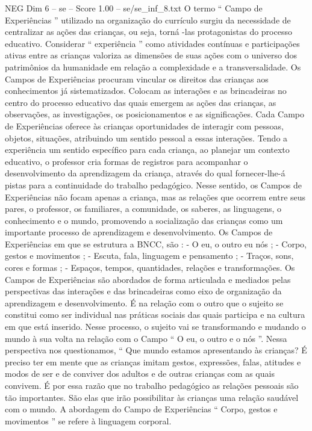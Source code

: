 \begin{textsample}{NEG Dim 6 – se – Score 1.00 – se/se\_inf\_8.txt}
O termo “ Campo de Experiências ” utilizado na organização do currículo surgiu da necessidade de centralizar as ações das crianças, ou seja, torná -las protagonistas do processo educativo.
Considerar “ experiência ” como atividades contínuas e participações ativas entre as crianças valoriza as dimensões de suas ações com o universo dos patrimônios da humanidade em relação a complexidade e a transversalidade.
Os Campos de Experiências procuram vincular os direitos das crianças aos conhecimentos já sistematizados.
Colocam as interações e as brincadeiras no centro do processo educativo das quais emergem as ações das crianças, as observações, as investigações, os posicionamentos e as significações.
Cada Campo de Experiências oferece às crianças oportunidades de interagir com pessoas, objetos, situações, atribuindo um sentido pessoal a essas interações.
Tendo a experiência um sentido específico para cada criança, ao planejar um contexto educativo, o professor cria formas de registros para acompanhar o desenvolvimento da aprendizagem da criança, através do qual fornecer-lhe-á pistas para a continuidade do trabalho pedagógico.
Nesse sentido, os Campos de Experiências não focam apenas a criança, mas as relações que ocorrem entre seus pares, o professor, os familiares, a comunidade, os saberes, as linguagens, o conhecimento e o mundo, promovendo a socialização das crianças como um importante processo de aprendizagem e desenvolvimento.
Os Campos de Experiências em que se estrutura a BNCC, são : - O eu, o outro eu nós ; - Corpo, gestos e movimentos ; - Escuta, fala, linguagem e pensamento ; - Traços, sons, cores e formas ; - Espaços, tempos, quantidades, relações e transformações.
Os Campos de Experiências são abordados de forma articulada e mediados pelas perspectivas das interações e das brincadeiras como eixo de organização da aprendizagem e desenvolvimento.
É na relação com o outro que o sujeito se constitui como ser individual nas práticas sociais das quais participa e na cultura em que está inserido.
Nesse processo, o sujeito vai se transformando e mudando o mundo à sua volta na relação com o Campo “ O eu, o outro e o nós ”.
Nessa perspectiva nos questionamos, “ Que mundo estamos apresentando às crianças?
É preciso ter em mente que as crianças imitam gestos, expressões, falas, atitudes e modos de ser e de conviver dos adultos e de outras crianças com as quais convivem.
É por essa razão que no trabalho pedagógico as relações pessoais são tão importantes.
São elas que irão possibilitar às crianças uma relação saudável com o mundo.
A abordagem do Campo de Experiências “ Corpo, gestos e movimentos ” se refere à linguagem corporal.

\end{textsample}
